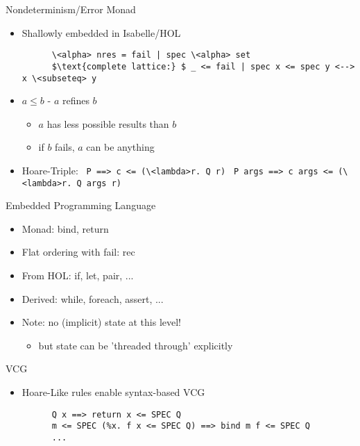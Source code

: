 \documentclass[fleqn]{beamer}
\begin{document}
\begin{frame}[fragile]{Nondeterminism/Error Monad}
  \begin{itemize}
   \item Shallowly embedded in Isabelle/HOL
    \begin{lstlisting}
      \<alpha> nres = fail | spec \<alpha> set
      $\text{complete lattice:} $ _ <= fail | spec x <= spec y <--> x \<subseteq> y
    \end{lstlisting}
   \item $a \le b$ - $a$ refines $b$
    \begin{itemize}
     \item $a$ has less possible results than $b$
     \item if $b$ fails, $a$ can be anything
    \end{itemize}
   \item Hoare-Triple:
    \lstinline{ P ==> c <= (\<lambda>r. Q r)} \lstinline{ P args ==> c args <= (\<lambda>r. Q args r)}

  \end{itemize}
\end{frame}
\begin{frame}[fragile]{Embedded Programming Language}
  \begin{itemize}
   \item Monad: bind, return
   \item Flat ordering with fail: rec
   \item From HOL: if, let, pair, ...
   \item Derived: while, foreach, assert, ...

   \item Note: no (implicit) state at this level!
    \begin{itemize}
     \item but state can be 'threaded through' explicitly

    \end{itemize}
  \end{itemize}
\end{frame}
\begin{frame}[fragile]{VCG}
  \begin{itemize}
   \item Hoare-Like rules enable syntax-based VCG
    \begin{lstlisting}
      Q x ==> return x <= SPEC Q
      m <= SPEC (%x. f x <= SPEC Q) ==> bind m f <= SPEC Q
      ...
    \end{lstlisting}

  \end{itemize}
\end{frame}
\end{document}
